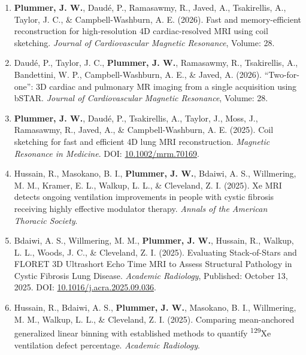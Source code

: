 \documentclass[12pt,]{scrartcl}
\begin{document}
\begin{enumerate}
  \leftskip-0.13in %



    \item \textbf{Plummer, J. W.}, Daudé, P., Ramasawmy, R., Javed, A., Tsakirellis, A., Taylor, J. C., \& Campbell-Washburn, A. E. (2026). Fast and memory-efficient reconstruction for high-resolution 4D cardiac-resolved MRI using coil sketching. \textit{Journal of Cardiovascular Magnetic Resonance}, Volume: 28.


    \item Daudé, P., Taylor, J. C., \textbf{Plummer, J. W.}, Ramasawmy, R., Tsakirellis, A., Bandettini, W. P., Campbell-Washburn, A. E., \& Javed, A. (2026). ``Two-for-one'': 3D cardiac and pulmonary MR imaging from a single acquisition using bSTAR. \textit{Journal of Cardiovascular Magnetic Resonance}, Volume: 28.


    \item \textbf{Plummer, J. W.}, Daudé, P., Tsakirellis, A., Taylor, J., Moss, J., Ramasawmy, R., Javed, A., \& Campbell-Washburn, A. E. (2025). Coil sketching for fast and efficient 4D lung MRI reconstruction. \textit{Magnetic Resonance in Medicine}. DOI: \href{https://doi.org/10.1002/mrm.70169}{10.1002/mrm.70169}.


    \item Hussain, R., Masokano, B. I., \textbf{Plummer, J. W.}, Bdaiwi, A. S., Willmering, M. M., Kramer, E. L., Walkup, L. L., \& Cleveland, Z. I. (2025). Xe MRI detects ongoing ventilation improvements in people with cystic fibrosis receiving highly effective modulator therapy. \textit{Annals of the American Thoracic Society}.
    
    \item Bdaiwi, A. S., Willmering, M. M., \textbf{Plummer, J. W.}, Hussain, R., Walkup, L. L., Woods, J. C., \& Cleveland, Z. I. (2025). Evaluating Stack-of-Stars and FLORET 3D Ultrashort Echo Time MRI to Assess Structural Pathology in Cystic Fibrosis Lung Disease. \textit{Academic Radiology}, Published: October 13, 2025. DOI: \href{https://doi.org/10.1016/j.acra.2025.09.036}{10.1016/j.acra.2025.09.036}.

    \item Hussain, R., Bdaiwi, A. S., \textbf{Plummer, J. W.}, Masokano, B. I., Willmering, M. M., Walkup, L. L., \& Cleveland, Z. I. (2025). Comparing mean-anchored generalized linear binning with established methods to quantify \textsuperscript{129}Xe ventilation defect percentage. \textit{Academic Radiology}.


\end{enumerate}
\end{document}
